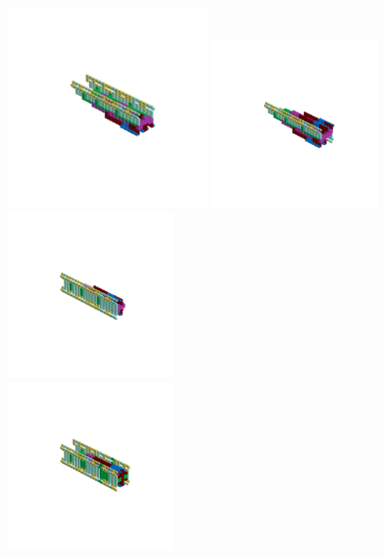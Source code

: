 \clearpage
\rhead[]{\leftmark}
\begin{minipage}[b]{0.48\linewidth}                                       
  \begin{figure}[H]
      \centering
        \vspace*{-1cm}
        \hspace*{-2cm}
        \includegraphics[width=6cm]{src/symmetries/pattern2_1-45.png}%
        \hspace*{-3cm}
        \includegraphics[width=5cm]{src/symmetries/pattern2_2-45.png}\\
        \vspace*{-3cm}
        \hspace*{-4cm}
        \includegraphics[width=5cm]{src/symmetries/pattern2_3-45.png} \\
        \vspace*{-5cm}
        \includegraphics[width=5cm]{src/symmetries/pattern2_4-45.png}
        \vspace*{-1cm}
  \caption*{}
  \end{figure}
\end{minipage}
